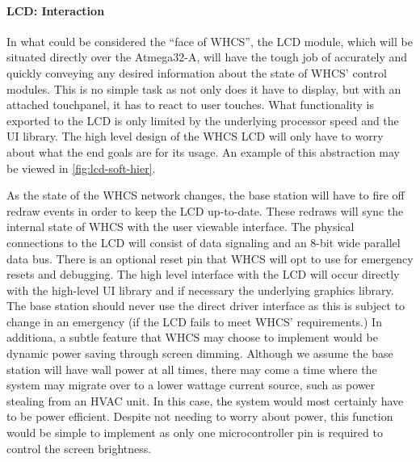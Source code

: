 \paragraph{LCD: Interaction}
In what could be considered the ``face of WHCS'', the LCD module, which will be
situated directly over the Atmega32-A, will have the tough job of accurately
and quickly conveying any desired information about the state of WHCS' control
modules. This is no simple task as not only does it have to display, but with
an attached touchpanel, it has to react to user touches. What functionality is
exported to the LCD is only limited by the underlying processor speed and the
UI library. The high level design of the WHCS LCD will only have to worry about
what the end goals are for its usage. An example of this abstraction may be
viewed in \autoref{fig:lcd-soft-hier}.


As the state of the WHCS network changes, the base station will have to fire
off redraw events in order to keep the LCD up-to-date. These redraws will sync
the internal state of WHCS with the user viewable interface. The physical
connections to the LCD will consist of data signaling and an 8-bit wide
parallel data bus. There is an optional reset pin that WHCS will opt to use for
emergency resets and debugging. The high level interface with the LCD will
occur directly with the high-level UI library and if necessary the underlying
graphics library. The base station should never use the direct driver interface
as this is subject to change in an emergency (if the LCD fails to meet WHCS'
requirements.) In additiona, a subtle feature that WHCS may choose to implement would be
dynamic power saving through screen dimming. Although we assume the base
station will have wall power at all times, there may come a time where the
system may migrate over to a lower wattage current source, such as power
stealing from an HVAC unit. In this case, the system would most certainly have
to be power efficient. Despite not needing to worry about power, this function
would be simple to implement as only one microcontroller pin is required to
control the screen brightness.

